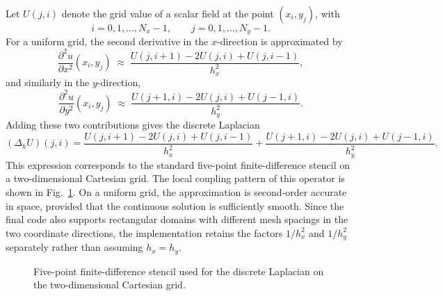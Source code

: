 Let $U(j,i)$ denote the grid value of a scalar field at the point $(x_i,y_j)$, with
\[
i=0,1,\dots,N_x-1,
\qquad
j=0,1,\dots,N_y-1.
\]
For a uniform grid, the second derivative in the $x$-direction is approximated by
\begin{equation}
\frac{\partial^2 u}{\partial x^2}(x_i,y_j)
\;\approx\;
\frac{U(j,i+1)-2U(j,i)+U(j,i-1)}{h_x^2},
\label{eq:uxx_central_numimpl}
\end{equation}
and similarly in the $y$-direction,
\begin{equation}
\frac{\partial^2 u}{\partial y^2}(x_i,y_j)
\;\approx\;
\frac{U(j+1,i)-2U(j,i)+U(j-1,i)}{h_y^2}.
\label{eq:uyy_central_numimpl}
\end{equation}
Adding these two contributions gives the discrete Laplacian
\begin{equation}
(\Delta_h U)(j,i)
=
\frac{U(j,i+1)-2U(j,i)+U(j,i-1)}{h_x^2}
+
\frac{U(j+1,i)-2U(j,i)+U(j-1,i)}{h_y^2}.
\label{eq:laplacian_5point_numimpl}
\end{equation}
This expression corresponds to the standard five-point finite-difference stencil on a two-dimensional Cartesian grid. The local coupling pattern of this operator is shown in Fig.~\ref{fig:five_point_stencil}. On a uniform grid, the approximation is second-order accurate in space, provided that the continuous solution is sufficiently smooth. Since the final code also supports rectangular domains with different mesh spacings in the two coordinate directions, the implementation retains the factors $1/h_x^2$ and $1/h_y^2$ separately rather than assuming $h_x=h_y$.

\begin{figure}[htbp]
  \centering
  \caption{Five-point finite-difference stencil used for the discrete Laplacian on the two-dimensional Cartesian grid.}
  \label{fig:five_point_stencil}
\end{figure}

